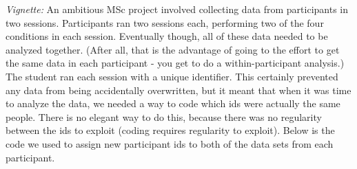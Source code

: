 \documentclass[
  12pt,
]{book}
\begin{document}
\emph{Vignette:} An ambitious MSc project involved collecting data from participants in two sessions. Participants ran two sessions each, performing two of the four conditions in each session. Eventually though, all of these data needed to be analyzed together. (After all, that is the advantage of going to the effort to get the same data in each participant - you get to do a within-participant analysis.) The student ran each session with a unique identifier. This certainly prevented any data from being accidentally overwritten, but it meant that when it was time to analyze the data, we needed a way to code which ids were actually the same people. There is no elegant way to do this, because there was no regularity between the ids to exploit (coding requires regularity to exploit). Below is the code we used to assign new participant ids to both of the data sets from each participant.
\end{document}
